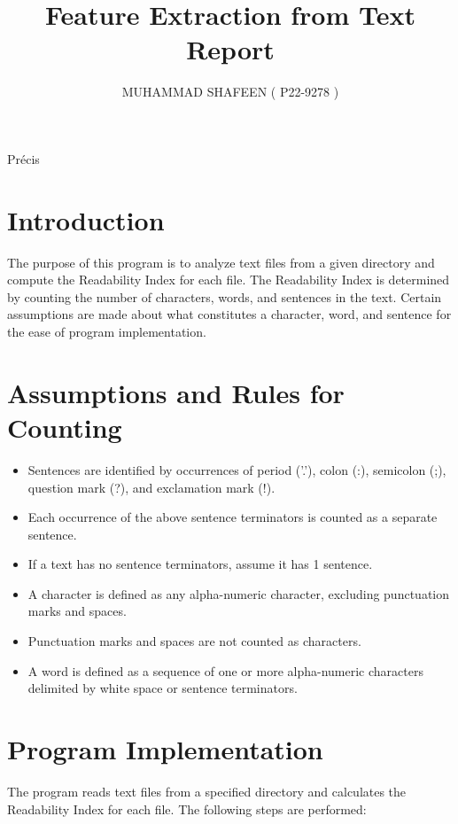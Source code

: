 \documentclass{article}
\title{Feature Extraction from Text Report}
\author{MUHAMMAD SHAFEEN ( P22-9278 ) }
\begin{document}
\maketitle

\begin{Précis}
Précis
\end{Précis}

\section{Introduction}

The purpose of this program is to analyze text files from a given directory and compute the Readability Index for each file. The Readability Index is determined by counting the number of characters, words, and sentences in the text. Certain assumptions are made about what constitutes a character, word, and sentence for the ease of program implementation.



\section{Assumptions and Rules for Counting}
 \begin{itemize}
\item Sentences are identified by occurrences of period ('.'), colon (:), semicolon (;), question mark (?), and exclamation mark (!).
\item Each occurrence of the above sentence terminators is counted as a separate sentence.
\item If a text has no sentence terminators, assume it has 1 sentence.
\item A character is defined as any alpha-numeric character, excluding punctuation marks and spaces.
\item Punctuation marks and spaces are not counted as characters.
\item A word is defined as a sequence of one or more alpha-numeric characters delimited by white space or sentence terminators.

 \end{itemize}
\section{ Program Implementation}
The program reads text files from a specified directory and calculates the Readability Index for each file. The following steps are performed:
\end{document}
